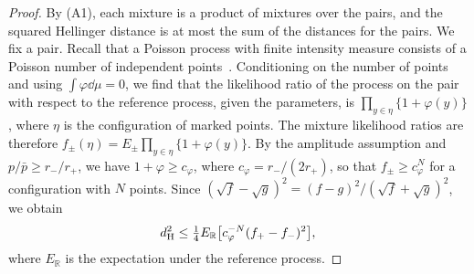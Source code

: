 \begin{proof}
By (A1), each mixture is a product of mixtures over the pairs, and the
squared Hellinger distance is at most the sum of the distances for the
pairs. We fix a pair. Recall that a Poisson process with finite
intensity measure consists of a Poisson number of independent points~\cite[Propositions~3.2
and~3.5]{lastpenrose}. Conditioning on the number of points and using
$\int\varphi\dd\mu=0$, we find that the likelihood ratio
of the process on the pair with respect to the reference process, given
the parameters, is $\prod_{y\in\eta}\{1+\varphi(y)\}$, where $\eta$ is
the configuration of marked points. The mixture likelihood ratios are
therefore $f_\pm(\eta)=E_\pm\prod_{y\in\eta}\{1+\varphi(y)\}$. By the
amplitude assumption and $p/\bar p\ge r_-/r_+$, we have
$1+\varphi\ge c_\varphi$, where $c_\varphi=r_-/(2r_+)$, so that
$f_\pm\ge c_\varphi^N$ for a configuration with $N$ points. Since
$(\sqrt f-\sqrt g)^2=(f-g)^2/(\sqrt f+\sqrt g)^2$, we obtain
\begin{equation}\label{eq:hellinger-weighted}
 d_{\rm H}^2\le\tfrac14E_{\mathbb R}\bigl[c_\varphi^{-N}(f_+-f_-)^2\bigr],
\end{equation}
where $E_{\mathbb R}$ is the expectation under the reference process.


\end{proof}
